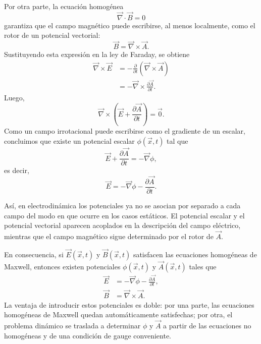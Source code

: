 \documentclass[12pt,a4paper]{article}
\theoremstyle{definition}
\theoremstyle{plain}
\numberwithin{equation}{section}
\theoremstyle{remark}
\newcommand{\E}{\vec{E}}
\newcommand{\B}{\vec{B}}
\begin{document}
Por otra parte, la ecuación homogénea
\begin{equation*}
    \vec\nabla\cdot \B = 0
\end{equation*}
garantiza que el campo magnético puede escribirse, al menos localmente, como el rotor de un potencial vectorial:
\begin{equation*}
    \B = \vec\nabla\times\vec A.
\end{equation*}
Sustituyendo esta expresión en la ley de Faraday, se obtiene
\begin{align*}
    \vec\nabla\times\E &= -\frac{\partial}{\partial t}\left(\vec\nabla\times\vec A\right) \\
    &= -\vec\nabla\times\frac{\partial \vec A}{\partial t}.
\end{align*}
Luego,
\begin{equation*}
    \vec\nabla\times\left(\E + \frac{\partial \vec A}{\partial t}\right) = \vec 0.
\end{equation*}
Como un campo irrotacional puede escribirse como el gradiente de un escalar, concluimos que existe un potencial escalar $\phi(\vec x,t)$ tal que
\begin{equation*}
    \E + \frac{\partial \vec A}{\partial t} = -\vec\nabla \phi,
\end{equation*}
es decir,
\begin{equation*}
    \E = -\vec\nabla \phi - \frac{\partial \vec A}{\partial t}.
\end{equation*}

Así, en electrodinámica los potenciales ya no se asocian por separado a cada campo del modo en que ocurre en los casos estáticos. El potencial escalar y el potencial vectorial aparecen acoplados en la descripción del campo eléctrico, mientras que el campo magnético sigue determinado por el rotor de $\vec A$.

En consecuencia, si $\E(\vec x,t)$ y $\B(\vec x,t)$ satisfacen las ecuaciones homogéneas de Maxwell, entonces existen potenciales $\phi(\vec x,t)$ y $\vec A(\vec x,t)$ tales que
\begin{align}
    \E &= -\vec\nabla \phi - \frac{\partial \vec A}{\partial t}, \label{3.campo-electrico-en-potenciales}\\
    \B &= \vec\nabla\times\vec A.\label{3.campo-magnetico-en-potenciales}
\end{align}
La ventaja de introducir estos potenciales es doble: por una parte, las ecuaciones homogéneas de Maxwell quedan automáticamente satisfechas; por otra, el problema dinámico se traslada a determinar $\phi$ y $\vec A$ a partir de las ecuaciones no homogéneas y de una condición de gauge conveniente.
\end{document}

